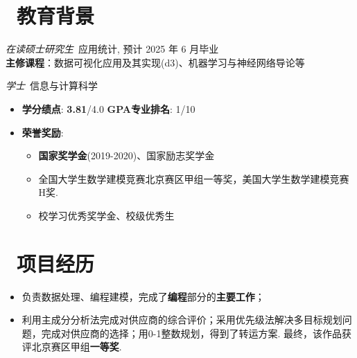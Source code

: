 \documentclass{resume}
\begin{document}



\section{\faGraduationCap\  教育背景}
\textit{在读硕士研究生}\ 应用统计, 预计 2025 年 6 月毕业\\
\textbf{主修课程}：数据可视化应用及其实现(d3)、机器学习与神经网络导论等

\textit{学士}\ 信息与计算科学
\begin{itemize}
	\item \textbf{学分绩点}: \textbf{3.81}/4.0 \quad \textbf{GPA专业排名}: 1/10
	\item \textbf{荣誉奖励}:
	      \begin{itemize}[label=$\ast$]
		      \item \textbf{国家奖学金}(2019-2020)、国家励志奖学金
		      \item 全国大学生数学建模竞赛北京赛区甲组一等奖，美国大学生数学建模竞赛H奖.
		      \item 校学习优秀奖学金、校级优秀生
	      \end{itemize}
\end{itemize}

\section{\faUsers\ 项目经历}
\begin{itemize}
	\item 负责数据处理、编程建模，完成了\textbf{编程}部分的\textbf{主要工作}；
	\item 利用主成分分析法完成对供应商的综合评价；采用优先级法解决多目标规划问题，完成对供应商的选择；用0-1整数规划，得到了转运方案. 最终，该作品获评北京赛区甲组\textbf{一等奖}.
\end{itemize}
\end{document}
